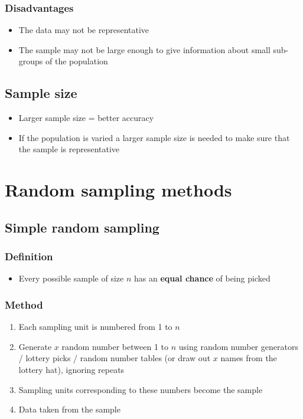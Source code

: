 \subsubsection{Disadvantages}
\begin{itemize}
	\item The data may not be representative
	\item The sample may not be large enough to give information about small sub-groups of the population
\end{itemize}
\subsection{Sample size}
\begin{itemize}
	\item Larger sample size = better accuracy
	\item If the population is varied a larger sample size is needed to make sure that the sample is representative
\end{itemize}


\section{Random sampling methods}
\subsection{Simple random sampling}
\subsubsection{Definition}
\begin{itemize}
	\item Every possible sample of size $n$ has an \textbf{equal chance} of being picked
\end{itemize}
\subsubsection{Method}
\begin{enumerate}
	\item Each sampling unit is numbered from 1 to $n$
	\item Generate $x$ random number between 1 to $n$ using random number generators / lottery picks / random number tables (or draw out $x$ names from the lottery hat), ignoring repeats
	\item Sampling units corresponding to these numbers become the sample
	\item Data taken from the sample
\end{enumerate}
